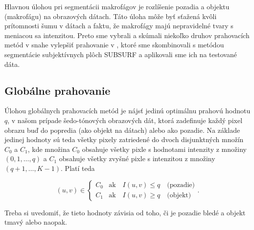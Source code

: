 \documentclass[a4paper,11pt,oneside]{article}%
\begin{document}
Hlavnou úlohou pri segmentácii makrofágov je rozlíšenie pozadia a objektu (makrofágu) na obrazových dátach. Táto úloha môže byť sťažená kvôli prítomnosti šumu v dátach a faktu, že
makrofágy majú nepravidelné tvary s meniacou sa intenzitou. Preto sme vybrali a skúmali niekoľko druhov prahovacích metód v snahe vylepšiť prahovanie  v \cite{sora}, ktoré sme skombinovali  s metódou segmentácie subjektívnych plôch SUBSURF a aplikovali sme ich na testované dáta.

\subsection{Globálne prahovanie}


 Úlohou globálnych prahovacích metód je nájsť jedinú optimálnu prahovú hodnotu $q$, v našom prípade šedo-tónových obrazových dát, ktorá zadefinuje každý pixel obrazu buď do popredia (ako objekt na dátach) alebo ako pozadie.  Na základe jedinej hodnoty sú teda všetky pixely zatriedené do dvoch disjunktných množín $C_0$ a $C_1$, kde množina $C_0$ obsahuje všetky pixle s hodnotami intenzity z množiny  $(0, 1, \dots , q)$ a $C_1$ obsahuje všetky zvyšné pixle s intenzitou z množiny $(q+1, \dots , K-1)$. Platí  teda

\begin{equation}
(u, v) \in \begin{cases} C_0 & \text{ak} \hspace{1em} I(u,v) \leq q \hspace{1em} \text{(pozadie)} \\  C_1 & \text{ak} \hspace{1em} I(u,v) \geq q \hspace{1em} \text{(objekt)} \end{cases}.
\end{equation}

Treba si uvedomiť, že tieto hodnoty závisia od toho, či je pozadie bledé a objekt tmavý alebo naopak.
\end{document}

